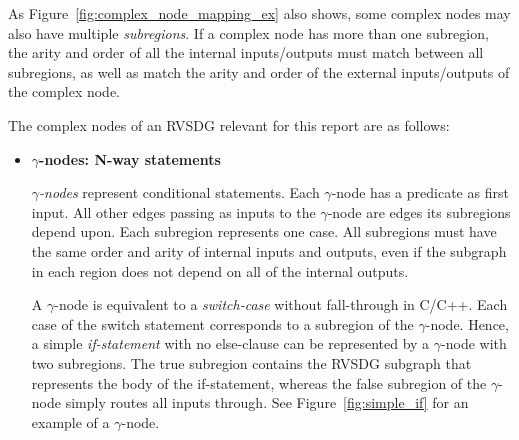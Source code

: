 As Figure~\ref{fig:complex_node_mapping_ex} also shows, some complex nodes may
also have multiple \textit{subregions}. If a complex node has more than one
subregion, the arity and order of all the internal inputs/outputs must match
between all subregions, as well as match the arity and order of the external
inputs/outputs of the complex node.

The complex nodes of an RVSDG relevant for this report are as follows:

\begin{itemize}

\item \textbf{$\gamma$-nodes: N-way statements}

\textit{$\gamma$-nodes} represent conditional statements. Each $\gamma$-node has
a predicate as first input. All other edges passing as inputs to the
$\gamma$-node are edges its subregions depend upon. Each subregion represents
one case. All subregions must have the same order and arity of internal inputs
and outputs, even if the subgraph in each region does not depend on all of the
internal outputs.

A $\gamma$-node is equivalent to a \textit{switch-case} without fall-through in
C/C++. Each case of the switch statement corresponds to a subregion of the
$\gamma$-node. Hence, a simple \textit{if-statement} with no else-clause can be
represented by a $\gamma$-node with two subregions. The true subregion contains
the RVSDG subgraph that represents the body of the if-statement, whereas the
false subregion of the $\gamma$-node simply routes all inputs through. See
Figure~\ref{fig:simple_if} for an example of a $\gamma$-node.


\end{itemize}
